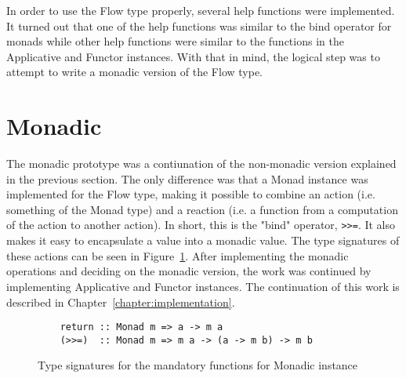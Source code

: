 In order to use the Flow type properly, several help functions were implemented. It turned out that one of the help functions was similar to the bind operator for monads while other help functions were similar to the functions in the Applicative and Functor instances. With that in mind, the logical step was to attempt to write a monadic version of the Flow type.
\section{Monadic}
The monadic prototype was a contiunation of the non-monadic version explained in the previous section. The only difference was that a Monad instance was implemented for the Flow type, making it possible to combine an action (i.e. something of the Monad type) and a reaction (i.e. a function from a computation of the action to another action). In short, this is the "bind" operator, {\tt >>=}. It also makes it easy to encapsulate a value into a monadic value. The type signatures of these actions can be seen in Figure~\ref{fig:monadic_actions}. After implementing the monadic operations and deciding on the monadic version, the work was continued by implementing Applicative and Functor instances. The continuation of this work is described in Chapter~\ref{chapter:implementation}.
\begin{figure}[h]
  \begin{verbatim}
    return :: Monad m => a -> m a
    (>>=)  :: Monad m => m a -> (a -> m b) -> m b
  \end{verbatim}
  \caption{Type signatures for the mandatory functions for Monadic instance}
  \label{fig:monadic_actions}
\end{figure}
